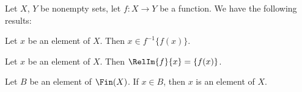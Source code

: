 \documentclass{article}
\begin{document}
Let $X$, $Y$ be nonempty sets, let $f\colon X\to Y$ be a function. We
have the following results:
\begin{thm}
\item\label{setwiseo:7} Let $x$ be an element of $X$. Then $x\in f^{-1}\{f(x)\}$.
\item\label{setwiseo:8} Let $x$ be an element of $X$. Then $\RelIm{f}{x}=\{f(x)\}$.
\item\label{setwiseo:9} Let $B$ be an element of $\Fin(X)$.
  If $x\in B$, then $x$ is an element of $X$.
\item\label{setwiseo:10} 
\item\label{setwiseo:11} 
\item\label{setwiseo:12} 
\item\label{setwiseo:13} 
\item\label{setwiseo:14} 
\item\label{setwiseo:15} 
\item\label{setwiseo:16} 
\item\label{setwiseo:17} 
\item\label{setwiseo:18} 
\item\label{setwiseo:19} 
\item\label{setwiseo:20} 
\item\label{setwiseo:21} 
\item\label{setwiseo:22} 
\item\label{setwiseo:23} 
\item\label{setwiseo:24} 
\item\label{setwiseo:25} 
\item\label{setwiseo:26} 
\item\label{setwiseo:27} 
\item\label{setwiseo:28} 
\item\label{setwiseo:29} 
\item\label{setwiseo:30} 
\item\label{setwiseo:31} 
\item\label{setwiseo:32} 
\item\label{setwiseo:33} 
\item\label{setwiseo:34} 
\item\label{setwiseo:35} 
\item\label{setwiseo:36} 
\item\label{setwiseo:37} 
\item\label{setwiseo:38} 
\item\label{setwiseo:39} 
\item\label{setwiseo:40} 
\item\label{setwiseo:41} 

\end{thm}
\end{document}
